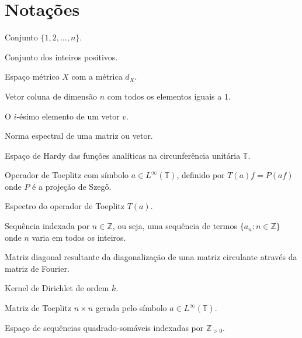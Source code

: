 \section*{Notações}

\begin{description}[leftmargin=!, labelwidth=\widthof{\texttt{Função $f : X \to Y$}}]
  \item[{$[n]$}] Conjunto $\{1, 2, \dots, n\}$.

  \item[$\mathbb{Z}_{>0}$] Conjunto dos inteiros positivos.

  \item[$(X, d_X)$] Espaço métrico $X$ com a métrica $d_X$.

  \item[$\mathbf{1}_n$] Vetor coluna de dimensão $n$ com todos os elementos iguais a $1$.

  \item[$(v)_i$] O $i$-ésimo elemento de um vetor $v$.

  \item[$\| \cdot \|_2$] Norma espectral de uma matriz ou vetor.

  \item[$H^2(\mathbb{T})$] Espaço de Hardy das funções analíticas na circunferência unitária $\mathbb{T}$.

  \item[$T(a)$] Operador de Toeplitz com símbolo $a \in L^\infty(\mathbb{T})$, definido por $T(a)f = P(af)$ onde $P$ é a projeção de Szegő.

  \item[$\sigma(T(a))$] Espectro do operador de Toeplitz $T(a)$.

  \item[$\{a_n\}$] Sequência indexada por $n \in \mathbb{Z}$, ou seja, uma sequência de termos $\{a_n : n \in \mathbb{Z}\}$ onde $n$ varia em todos os inteiros.

  \item[$\Lambda$] Matriz diagonal resultante da diagonalização de uma matriz circulante através da matriz de Fourier.

  \item[$D_k(t)$] Kernel de Dirichlet de ordem $k$.

  \item[$T_n(a)$] Matriz de Toeplitz $n \times n$ gerada pelo símbolo $a \in L^\infty(\mathbb{T})$.

  \item[$l^2(\mathbb{Z}_{> 0})$] Espaço de sequências quadrado-somáveis indexadas por $\mathbb{Z}_{> 0}$.


\end{description}

